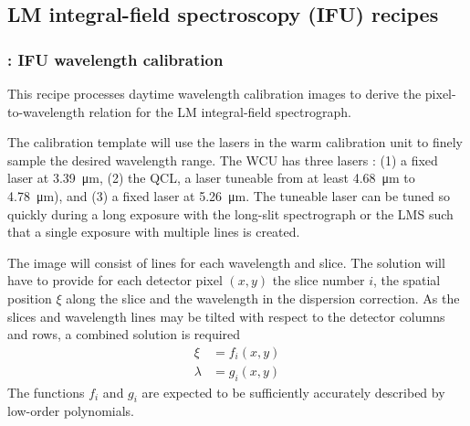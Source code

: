 
\clearpage
\subsection{LM integral-field spectroscopy (IFU) recipes}
\label{ssec:IFU_recipes}


\subsubsection{: IFU wavelength calibration}
\label{sssec:ifu_wavecal}
\label{rec:metis_ifu_wavecal}

This recipe processes daytime wavelength calibration images to derive
the pixel-to-wavelength relation for the LM integral-field
spectrograph.

The calibration template will use the lasers in the warm calibration
unit to finely sample the desired wavelength range.
The \ac{WCU} has three lasers \cite{METIS-calibration_plan}:
(1) a fixed laser at \SI{3.39}{\micro\metre},
(2) the \ac{QCL}, a laser tuneable from at least \SI{4.68}{\micro\metre} to \SI{4.78}{\micro\metre}), and
(3) a fixed laser at \SI{5.26}{\micro\metre}.
The tuneable laser can be tuned so quickly during a long exposure with the
long-slit spectrograph or the LMS such that a single exposure with multiple
lines is created.


The image will consist of lines for each wavelength and slice.
The solution will have to provide for each detector pixel
$(x,y)$ the slice number $i$, the spatial position $\xi$ along the
slice and the wavelength in the dispersion correction. As the slices
and wavelength lines may be tilted with respect to the detector
columns and rows, a combined solution is required
\begin{align}
  \label{eq:wavelength_solution}
  \xi &= f_{i}(x, y) \\
  \lambda &= g_{i}(x, y)
\end{align}
The functions $f_{i}$ and $g_{i}$ are expected to be
sufficiently accurately described by low-order polynomials.

